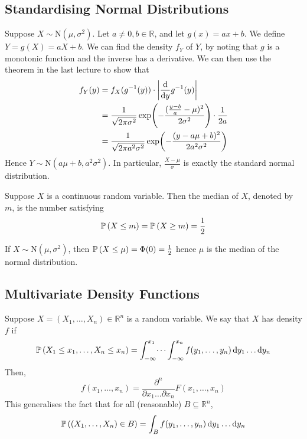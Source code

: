 \subsection{Standardising Normal Distributions}
Suppose \(X \sim \mathrm{N}(\mu, \sigma^2)\).
Let \(a \neq 0, b \in \mathbb R\), and let \(g(x) = ax+b\).
We define \(Y = g(X) = aX+b\).
We can find the density \(f_Y\) of \(Y\), by noting that \(g\) is a monotonic function and the inverse has a derivative.
We can then use the theorem in the last lecture to show that
\begin{align*}
	f_Y(y) & = f_X(g^{-1}(y)) \cdot \abs{\dv{y} g^{-1}(y)}                                                       \\
	       & = \frac{1}{\sqrt{2\pi\sigma^2}} \exp(-\frac{(\frac{y-b}{a} - \mu)^2}{2\sigma^2}) \cdot \frac{1}{2a} \\
	       & =\frac{1}{\sqrt{2\pi a^2\sigma^2}} \exp(-\frac{(y - a\mu + b)^2}{2 a^2 \sigma^2})
\end{align*}
Hence \(Y \sim \mathrm{N}(a \mu + b, a^2 \sigma^2)\).
In particular, \(\frac{X-\mu}{\sigma}\) is exactly the standard normal distribution.
\begin{definition}
	Suppose \(X\) is a continuous random variable.
	Then the median of \(X\), denoted by \(m\), is the number satisfying
	\[
		\mathbb{P}\left({X \leq m}\right) = \mathbb{P}\left({X \geq m}\right) = \frac{1}{2}
	\]
\end{definition}
\noindent If \(X \sim \mathrm{N}(\mu, \sigma^2)\), then \(\mathbb{P}\left({X \leq \mu}\right) = \Phi(0) = \frac{1}{2}\) hence \(\mu\) is the median of the normal distribution.

\subsection{Multivariate Density Functions}
Suppose \(X = (X_1, \dots, X_n) \in \mathbb R^n\) is a random variable.
We say that \(X\) has density \(f\) if
\[
	\mathbb{P}\left({X_1 \leq x_1, \dots, X_n \leq x_n}\right) = \int_{-\infty}^{x_1} \dots \int_{-\infty}^{x_n}  f(y_1, \dots, y_n) \dd{y_1} \dots \dd{y_n}
\]
Then,
\[
	f(x_1, \dots, x_n) = \frac{\partial^n}{\partial x_1 \dots \partial x_n} F(x_1, \dots, x_n)
\]
This generalises the fact that for all (reasonable) \(B \subseteq \mathbb R^n\),
\[
	\mathbb{P}\left({(X_1, \dots, X_n) \in B}\right) = \int_B f(y_1, \dots, y_n) \dd{y_1}\dots\dd{y_n}
\]

